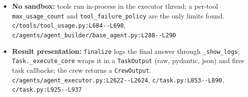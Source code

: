 \begin{itemize}
\item \textbf{No sandbox:} tools run in-process in the executor thread; a per-tool \texttt{max\_\allowbreak{}usage\_\allowbreak{}count} and \texttt{tool\_\allowbreak{}failure\_\allowbreak{}policy} are the only limits found. \texttt{c/\allowbreak{}tools/\allowbreak{}tool\_\allowbreak{}usage.\allowbreak{}py:\allowbreak{}L684-\allowbreak{}-\allowbreak{}L690}, \texttt{c/\allowbreak{}agents/\allowbreak{}agent\_\allowbreak{}builder/\allowbreak{}base\_\allowbreak{}agent.\allowbreak{}py:\allowbreak{}L288-\allowbreak{}-\allowbreak{}L290}
\item \textbf{Result presentation:} \texttt{finalize} logs the final answer through \texttt{\_\allowbreak{}show\_\allowbreak{}logs}; \texttt{Task.\allowbreak{}\_\allowbreak{}execute\_\allowbreak{}core} wraps it in a \texttt{TaskOutput} (raw, pydantic, json) and fires task callbacks; the crew returns a \texttt{CrewOutput}. \texttt{c/\allowbreak{}agents/\allowbreak{}agent\_\allowbreak{}executor.\allowbreak{}py:\allowbreak{}L2622-\allowbreak{}-\allowbreak{}L2624}, \texttt{c/\allowbreak{}task.\allowbreak{}py:\allowbreak{}L853-\allowbreak{}-\allowbreak{}L890}, \texttt{c/\allowbreak{}task.\allowbreak{}py:\allowbreak{}L925-\allowbreak{}-\allowbreak{}L937}
\end{itemize}

